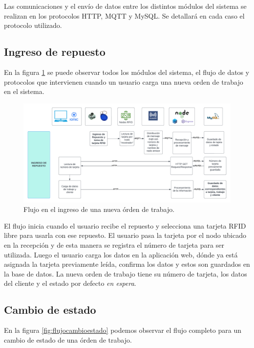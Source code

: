Las comunicaciones y el envío de datos entre los distintos módulos del sistema se realizan en los protocolos HTTP, MQTT y MySQL. Se detallará en cada caso el protocolo utilizado.

\subsection{Ingreso de repuesto}
\label{subsec:ingresorepuesto}
En la figura \ref{fig:flujoingreso} se puede observar todos los módulos del sistema, el flujo de datos y protocolos que intervienen cuando un usuario carga una nueva orden de trabajo en el sistema.

\begin{figure}[ht]
	\centering
	\includegraphics[scale=.20]{./Figures/flujoingreso.png}
	\caption{Flujo en el ingreso de una nueva órden de trabajo.}
	\label{fig:flujoingreso}
\end{figure}
  
El flujo inicia cuando el usuario recibe el repuesto y selecciona una tarjeta RFID libre para usarla con ese repuesto. El usuario pasa la tarjeta por el nodo ubicado en la recepción y de esta manera se registra el número de tarjeta para ser utilizada. Luego el usuario carga los datos en la aplicación web, dónde ya está asignada la tarjeta previamente leída, confirma los datos y estos son guardados en la base de datos. La nueva orden de trabajo tiene su número de tarjeta, los datos del cliente y el estado por defecto \textit{en espera}.

\subsection{Cambio de estado}
\label{subsec:flujocambioestado}

En la figura \ref{fig:flujocambioestado} podemos observar el flujo completo para un cambio de estado de una órden de trabajo.

